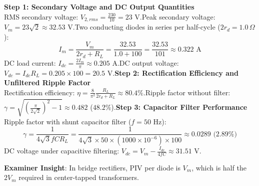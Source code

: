 \begin{solbox}
\textbf{Step 1: Secondary Voltage and DC Output Quantities}\\RMS secondary voltage: $V_{2,rms} = \frac{230}{10} = 23\text{ V}$.Peak secondary voltage: $V_m = 23\sqrt{2} \approx 32.53\text{ V}$.Two conducting diodes in series per half-cycle ($2r_d = 1.0\,\Omega$):\[ I_m = \frac{V_m}{2r_d + R_L} = \frac{32.53}{1.0 + 100} = \frac{32.53}{101} \approx 0.322\text{ A} \]DC load current: $I_{dc} = \frac{2 I_m}{\pi} \approx 0.205\text{ A}$.DC output voltage: $V_{dc} = I_{dc} R_L = 0.205 \times 100 = 20.5\text{ V}$.\textbf{Step 2: Rectification Efficiency and Unfiltered Ripple Factor}\\Rectification efficiency: $\eta = \frac{8}{\pi^2}\frac{R_L}{2r_d + R_L} \approx 80.4\%$.Ripple factor without filter: $\gamma = \sqrt{\left(\frac{\pi}{2\sqrt{2}}\right)^2 - 1} \approx 0.482$ ($48.2\%$).\textbf{Step 3: Capacitor Filter Performance}\\Ripple factor with shunt capacitor filter ($f = 50\text{ Hz}$):\[ \gamma = \frac{1}{4\sqrt{3} f C R_L} = \frac{1}{4\sqrt{3} \times 50 \times (1000 \times 10^{-6}) \times 100} \approx 0.0289 \text{ (} 2.89\% \text{)} \]DC voltage under capacitive filtering: $V_{dc} = V_m - \frac{I_{dc}}{4 f C} \approx 31.51\text{ V}$.
\end{solbox}

\begin{examinertip}
\textbf{Examiner Insight}: In bridge rectifiers, PIV per diode is $V_m$, which is half the $2V_m$ required in center-tapped transformers.
\end{examinertip}
\vspace{4mm}
